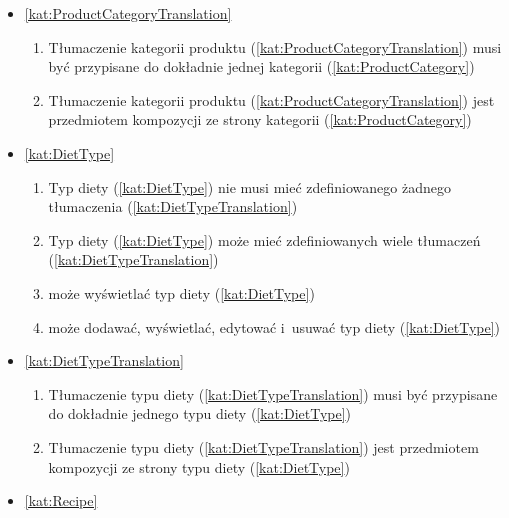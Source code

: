 \begin{itemize}[label={\textbf{Reguły dla}}, wide, labelwidth=!, labelindent=0pt]
    \item\ref{kat:ProductCategoryTranslation}
    \begin{enumerate}[label={\textbf{REG/\protect\threedigits{\arabic{enumi}}}}, wide, labelwidth=!, align=left, leftmargin=3cm, resume]
        \item Tłumaczenie kategorii produktu (\ref{kat:ProductCategoryTranslation}) musi być przypisane do dokładnie jednej kategorii (\ref{kat:ProductCategory})
        \item Tłumaczenie kategorii produktu (\ref{kat:ProductCategoryTranslation}) jest przedmiotem kompozycji ze strony kategorii (\ref{kat:ProductCategory})
    \end{enumerate}
    \item\ref{kat:DietType}
    \begin{enumerate}[label={\textbf{REG/\protect\threedigits{\arabic{enumi}}}}, wide, labelwidth=!, align=left, leftmargin=3cm, resume]
        \item Typ diety (\ref{kat:DietType}) nie musi mieć zdefiniowanego żadnego tłumaczenia (\ref{kat:DietTypeTranslation})
        \item Typ diety (\ref{kat:DietType}) może mieć zdefiniowanych wiele tłumaczeń (\ref{kat:DietTypeTranslation})
        \item {} może wyświetlać typ diety (\ref{kat:DietType})
        \item {} może dodawać, wyświetlać, edytować i~usuwać typ diety (\ref{kat:DietType})
    \end{enumerate}
    \item\ref{kat:DietTypeTranslation}
    \begin{enumerate}[label={\textbf{REG/\protect\threedigits{\arabic{enumi}}}}, wide, labelwidth=!, align=left, leftmargin=3cm, resume]
        \item Tłumaczenie typu diety (\ref{kat:DietTypeTranslation}) musi być przypisane do dokładnie jednego typu diety (\ref{kat:DietType})
        \item Tłumaczenie typu diety (\ref{kat:DietTypeTranslation}) jest przedmiotem kompozycji ze strony typu diety (\ref{kat:DietType})
    \end{enumerate}
    \item\ref{kat:Recipe}
    \begin{enumerate}[label={\textbf{REG/\protect\threedigits{\arabic{enumi}}}}, wide, labelwidth=!, align=left, leftmargin=3cm, resume]

\end{enumerate}
\end{itemize}
